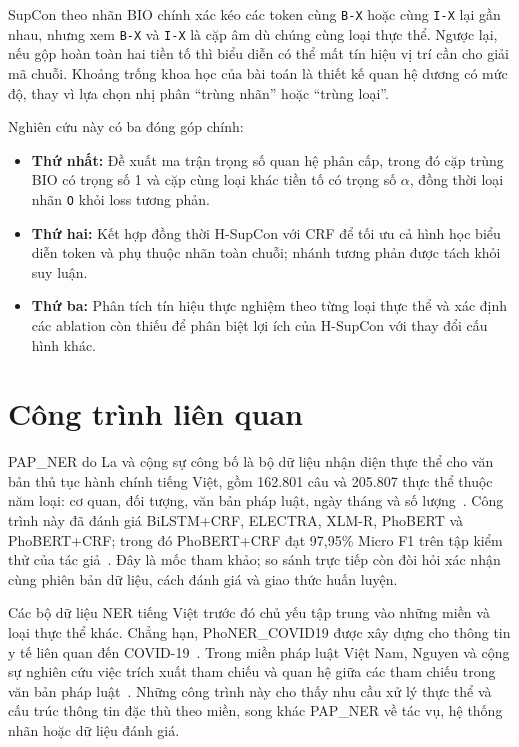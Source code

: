 \documentclass[conference,a4paper]{IEEEtran}
\begin{document}
SupCon theo nhãn BIO chính xác kéo các token cùng \texttt{B-X} hoặc cùng
\texttt{I-X} lại gần nhau, nhưng xem \texttt{B-X} và \texttt{I-X} là
cặp âm dù chúng cùng loại thực thể. Ngược lại, nếu gộp hoàn toàn hai
tiền tố thì biểu diễn có thể mất tín hiệu vị trí cần cho giải mã chuỗi.
Khoảng trống khoa học của bài toán là thiết kế quan hệ dương có mức độ,
thay vì lựa chọn nhị phân ``trùng nhãn'' hoặc ``trùng loại''.

Nghiên cứu này có ba đóng góp chính:
\begin{itemize}
    \item \textbf{Thứ nhất:} Đề xuất ma trận trọng số quan hệ phân cấp, trong đó cặp trùng BIO có trọng số 1 và cặp cùng loại khác tiền tố có trọng số $\alpha$, đồng thời loại nhãn \texttt{O} khỏi loss tương phản.

    \item \textbf{Thứ hai:} Kết hợp đồng thời H-SupCon với CRF để tối ưu cả hình học biểu diễn token và phụ thuộc nhãn toàn chuỗi; nhánh tương phản được tách khỏi suy luận.

    \item \textbf{Thứ ba:} Phân tích tín hiệu thực nghiệm theo từng loại thực thể và xác định các ablation còn thiếu để phân biệt lợi ích của H-SupCon với thay đổi cấu hình khác.
\end{itemize}

\section{Công trình liên quan}\label{sec:related-work}

PAP\_NER do La và cộng sự công bố là bộ dữ liệu nhận diện thực thể
cho văn bản thủ tục hành chính tiếng Việt, gồm 162.801 câu và
205.807 thực thể thuộc năm loại: cơ quan, đối tượng, văn bản pháp luật,
ngày tháng và số lượng~\cite{la2026papner}. Công trình này đã đánh giá BiLSTM+CRF,
ELECTRA, XLM-R, PhoBERT và PhoBERT+CRF; trong đó PhoBERT+CRF đạt
97,95\% Micro F1 trên tập kiểm thử của tác giả~\cite{la2026papner}. Đây là mốc tham khảo; so sánh trực tiếp còn đòi hỏi xác nhận cùng phiên bản
dữ liệu, cách đánh giá và giao thức huấn luyện.

Các bộ dữ liệu NER tiếng Việt trước đó chủ yếu tập trung vào những
miền và loại thực thể khác. Chẳng hạn, PhoNER\_COVID19 được xây dựng
cho thông tin y tế liên quan đến COVID-19~\cite{truong2021phonercovid19}. Trong miền pháp luật
Việt Nam, Nguyen và cộng sự nghiên cứu việc trích xuất tham chiếu
và quan hệ giữa các tham chiếu trong văn bản pháp luật~\cite{nguyen2023legalreferences}. Những
công trình này cho thấy nhu cầu xử lý thực thể và cấu trúc thông tin
đặc thù theo miền, song khác PAP\_NER về tác vụ, hệ thống nhãn hoặc
dữ liệu đánh giá.
\end{document}
